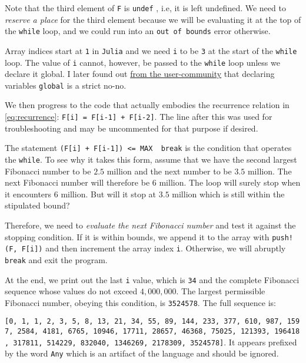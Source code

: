 \documentclass[
  a4paper,
]{article}
\begin{document}
Note that the third element of \texttt{F} is \texttt{undef} , i.e, it is
left undefined. We need to \emph{reserve a place} for the third element
because we will be evaluating it at the top of the \texttt{while} loop,
and we could run into an \texttt{out\ of\ bounds} error otherwise.

Array indices start at \texttt{1} in \texttt{Julia} and we need
\texttt{i} to be \texttt{3} at the start of the \texttt{while} loop. The
value of \texttt{i} cannot, however, be passed to the \texttt{while}
loop unless we declare it global. I later found out
\href{https://discourse.julialang.org/t/help-with-project-euler-2-undef-inits-printing-multiplication-by-juxtaposition-and-more/106930}{from
the user-community} that declaring variables \texttt{global} is a strict
no-no.

We then progress to the code that actually embodies the recurrence
relation in \cref{eq:recurrence}:
\texttt{F{[}i{]}\ =\ F{[}i-1{]}\ +\ F{[}i-2{]}}. The line after this was
used for troubleshooting and may be uncommented for that purpose if
desired.

The statement
\texttt{(F{[}i{]}\ +\ F{[}i-1{]})\ \textless{}=\ MAX\ \textbar{}\textbar{}\ break}
is the condition that operates the \texttt{while}. To see why it takes
this form, assume that we have the second largest Fibonacci number to be
\(2.5\) million and the next number to be \(3.5\) million. The next
Fibonacci number will therefore be \(6\) million. The loop will surely
stop when it encounters \(6\) million. But will it stop at \(3.5\)
million which is still within the stipulated bound?

Therefore, we need to \emph{evaluate the next Fibonacci number} and test
it against the stopping condition. If it is within bounds, we append it
to the array with \texttt{push!(F,\ F{[}i{]})} and then increment the
array index \texttt{i}. Otherwise, we will abruptly \texttt{break} and
exit the program.

At the end, we print out the last \texttt{i} value, which is \texttt{34}
and the complete Fibonacci sequence whose values do not exceed
\(4,000,000\). The largest permissible Fibonacci number, obeying this
condition, is \texttt{3524578}. The full sequence is:

\texttt{{[}0,\ 1,\ 1,\ 2,\ 3,\ 5,\ 8,\ 13,\ 21,\ 34,\ 55,\ 89,\ 144,\ 233,\ 377,\ 610,\ 987,\ 1597,\ 2584,\ 4181,\ 6765,\ 10946,\ 17711,\ 28657,\ 46368,\ 75025,\ 121393,\ 196418,\ 317811,\ 514229,\ 832040,\ 1346269,\ 2178309,\ 3524578{]}}.
It appears prefixed by the word \texttt{Any} which is an artifact of the
language and should be ignored.
\end{document}
